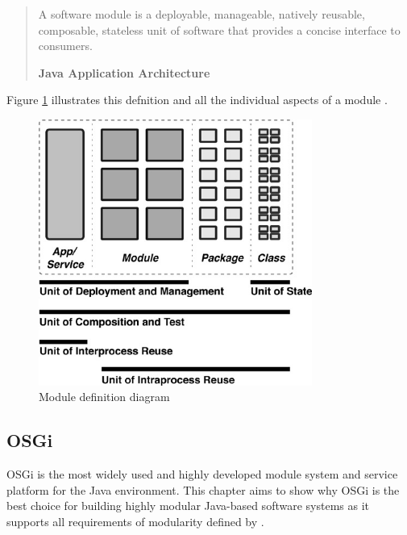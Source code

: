 \begin{quote}
A software module is a deployable, manageable, natively reusable, composable, stateless unit of software that provides a concise interface to consumers. 

\hfill \textbf{Java Application Architecture}

\hfill \citeauthor{Knoernschild:2012} \cite{Knoernschild:2012}
\end{quote}

Figure \ref{fig:module} illustrates this defnition and all the individual aspects of a module \cite{Knoernschild:2012}.

\begin{figure}[H]
\centering
\includegraphics[width=0.8\textwidth]{module.jpeg}
\caption{Module definition diagram}
\label{fig:module}
\end{figure}

\subsection{OSGi}
\gls{OSGi} is the most widely used and highly developed module system and service platform for the Java environment. This chapter aims to show why \gls{OSGi} is the best choice for building highly modular Java-based software systems as it supports all requirements of modularity defined by \citeauthor{Knoernschild:2012} \cite{Knoernschild:2012}.

